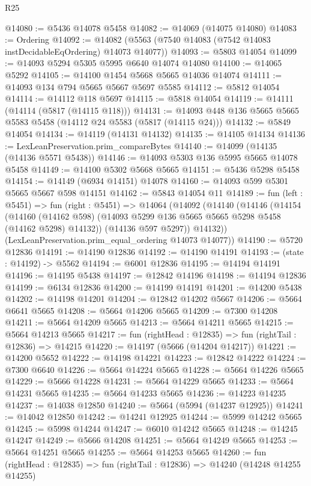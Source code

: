 \begin{lexlean}{R25}
\begin{coremodule}
@14080 := @5436 @14078 @5458
@14082 := @14069 (@14075 @14080)
@14083 := Ordering
@14092 := @14082 (@5563 (@7540 @14083 (@7542 @14083 instDecidableEqOrdering) @14073 @14077))
@14093 := @5803 @14054
@14099 := @14093 @5294 @5305 @5995 @6640 @14074 @14080
@14100 := @14065 @5292
@14105 := @14100 @1454 @5668 @5665 @14036 @14074
@14111 := @14093 @134 @794 @5665 @5667 @5697 @5585
@14112 := @5812 @14054
@14114 := @14112 @118 @5697
@14115 := @5818 @14054
@14119 := @14111 (@14114 (@5817 (@14115 @118)))
@14131 := @14093 @448 @136 @5665 @5665 @5583 @5458 (@14112 @24 @5583 (@5817 (@14115 @24)))
@14132 := @5849 @14054
@14134 := @14119 (@14131 @14132)
@14135 := @14105 @14134
@14136 := LexLeanPreservation.prim_compareBytes
@14140 := @14099 (@14135 (@14136 @5571 @5438))
@14146 := @14093 @5303 @136 @5995 @5665 @14078 @5458
@14149 := @14100 @5302 @5668 @5665
@14151 := @5436 @5298 @5458
@14154 := @14149 (@6934 @14151) @14078
@14160 := @14093 @599 @5301 @5665 @5667 @598 @14151
@14162 := @5843 @14054 @11
@14189 := fun (left : @5451) =>
  fun (right : @5451) =>
  @14064
    (@14092
      (@14140
        (@14146
          (@14154
            (@14160 (@14162 @598) (@14093 @5299 @136 @5665 @5665 @5298 @5458 (@14162 @5298) @14132))
            (@14136 @597 @5297))
          @14132))
      (LexLeanPreservation.prim_equal_ordering @14073 @14077))
@14190 := @5720 @12836
@14191 := @14190 @12836
@14192 := @14190 @14191
@14193 := (state : @14192) -> @5562
@14194 := @6001 @12836
@14195 := @14194 @14191
@14196 := @14195 @5438
@14197 := @12842 @14196
@14198 := @14194 @12836
@14199 := @6134 @12836
@14200 := @14199 @14191
@14201 := @14200 @5438
@14202 := @14198 @14201
@14204 := @12842 @14202 @5667
@14206 := @5664 @6641 @5665
@14208 := @5664 @14206 @5665
@14209 := @7300 @14208
@14211 := @5664 @14209 @5665
@14213 := @5664 @14211 @5665
@14215 := @5664 @14213 @5665
@14217 := fun (rightHead : @12835) => fun (rightTail : @12836) => @14215
@14220 := @14197 (@5666 (@14204 @14217))
@14221 := @14200 @5652
@14222 := @14198 @14221
@14223 := @12842 @14222
@14224 := @7300 @6640
@14226 := @5664 @14224 @5665
@14228 := @5664 @14226 @5665
@14229 := @5666 @14228
@14231 := @5664 @14229 @5665
@14233 := @5664 @14231 @5665
@14235 := @5664 @14233 @5665
@14236 := @14223 @14235
@14237 := @14038 @12850
@14240 := @5664 (@5994 (@14237 @12925))
@14241 := @14042 @12850
@14242 := @14241 @12925
@14244 := @5999 @14242 @5665
@14245 := @5998 @14244
@14247 := @6010 @14242 @5665
@14248 := @14245 @14247
@14249 := @5666 @14208
@14251 := @5664 @14249 @5665
@14253 := @5664 @14251 @5665
@14255 := @5664 @14253 @5665
@14260 := fun (rightHead : @12835) => fun (rightTail : @12836) => @14240 (@14248 @14255 @14255)

\end{coremodule}
\end{lexlean}
